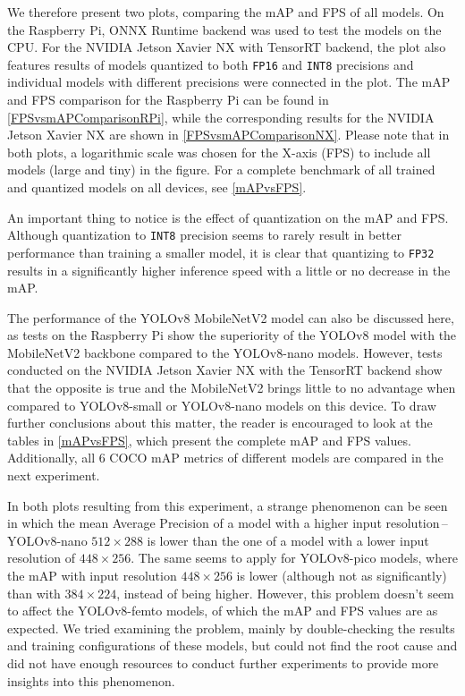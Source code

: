We therefore present two plots, comparing the mAP and FPS of all models. On the
Raspberry Pi, ONNX Runtime backend was used to test the models on the CPU. For
the NVIDIA Jetson Xavier NX with TensorRT backend, the plot also features
results of models quantized to both \texttt{FP16} and \texttt{INT8} precisions
and individual models with different precisions were connected in the plot. The
mAP and FPS comparison for the Raspberry Pi can be found in
\autoref{FPSvsmAPComparisonRPi}, while the corresponding results for the NVIDIA
Jetson Xavier NX are shown in \autoref{FPSvsmAPComparisonNX}. Please note that
in both plots, a logarithmic scale was chosen for the X-axis (FPS) to include
all models (large and tiny) in the figure. For a complete benchmark of all
trained and quantized models on all devices, see \autoref{mAPvsFPS}.

An important thing to notice is the effect of quantization on the mAP and FPS.
Although quantization to \texttt{INT8} precision seems to rarely result in
better performance than training a smaller model, it is clear that quantizing to
\texttt{FP32} results in a significantly higher inference speed with a little or
no decrease in the mAP.

The performance of the YOLOv8 MobileNetV2 model can also be discussed here, as
tests on the Raspberry Pi show the superiority of the YOLOv8 model with the
MobileNetV2 backbone compared to the YOLOv8-nano models. However, tests
conducted on the NVIDIA Jetson Xavier NX with the TensorRT backend show that the
opposite is true and the MobileNetV2 brings little to no advantage when compared
to YOLOv8-small or YOLOv8-nano models on this device. To draw further
conclusions about this matter, the reader is encouraged to look at the tables in
\autoref{mAPvsFPS}, which present the complete mAP and FPS values. Additionally,
all 6 COCO mAP metrics of different models are compared in the next experiment.

In both plots resulting from this experiment, a strange phenomenon can be seen
in which the mean Average Precision of a model with a higher input
resolution\,--\,YOLOv8-nano $512 \times 288$ is lower than the one of a model
with a lower input resolution of $448 \times 256$. The same seems to apply for
YOLOv8-pico models, where the mAP with input resolution $448 \times 256$ is
lower (although not as significantly) than with $384 \times 224$, instead of
being higher. However, this problem doesn't seem to affect the YOLOv8-femto
models, of which the mAP and FPS values are as expected. We tried examining the
problem, mainly by double-checking the results and training configurations of
these models, but could not find the root cause and did not have enough
resources to conduct further experiments to provide more insights into this
phenomenon.

